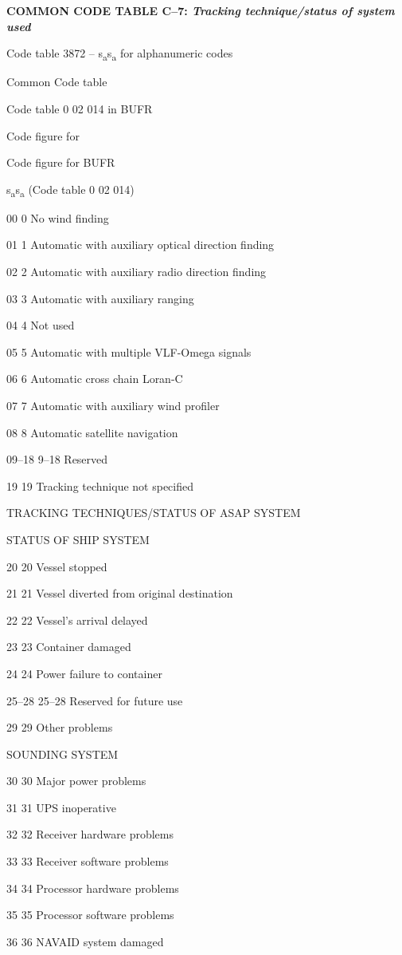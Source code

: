 \textbf{COMMON CODE TABLE C--7: \emph{Tracking technique/status of system used}}

Code table 3872 -- s\textsubscript{a}s\textsubscript{a} for alphanumeric codes

Common Code table

Code table 0 02 014 in BUFR

Code figure for

Code figure for BUFR

s\textsubscript{a}s\textsubscript{a} (Code table 0 02 014)

00 0 No wind finding

01 1 Automatic with auxiliary optical direction finding

02 2 Automatic with auxiliary radio direction finding

03 3 Automatic with auxiliary ranging

04 4 Not used

05 5 Automatic with multiple VLF-Omega signals

06 6 Automatic cross chain Loran-C

07 7 Automatic with auxiliary wind profiler

08 8 Automatic satellite navigation

09--18 9--18 Reserved

19 19 Tracking technique not specified

TRACKING TECHNIQUES/STATUS OF ASAP SYSTEM

STATUS OF SHIP SYSTEM

20 20 Vessel stopped

21 21 Vessel diverted from original destination

22 22 Vessel's arrival delayed

23 23 Container damaged

24 24 Power failure to container

25--28 25--28 Reserved for future use

29 29 Other problems

SOUNDING SYSTEM

30 30 Major power problems

31 31 UPS inoperative

32 32 Receiver hardware problems

33 33 Receiver software problems

34 34 Processor hardware problems

35 35 Processor software problems

36 36 NAVAID system damaged

